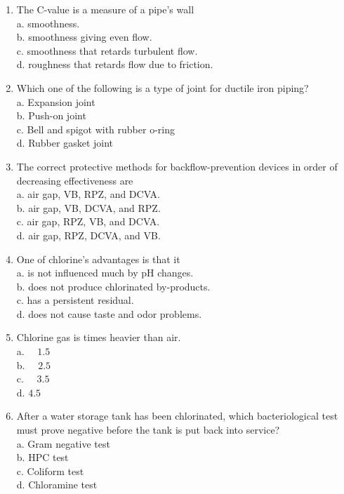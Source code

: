 \documentclass[10pt]{article}
\begin{document}
\begin{enumerate}
  \item The C-value is a measure of a pipe's wall\\
a. smoothness.\\
b. smoothness giving even flow.\\
c. smoothness that retards turbulent flow.\\
d. roughness that retards flow due to friction.

  \item Which one of the following is a type of joint for ductile iron piping?\\
a. Expansion joint\\
b. Push-on joint\\
c. Bell and spigot with rubber o-ring\\
d. Rubber gasket joint

  \item The correct protective methods for backflow-prevention devices in order of decreasing effectiveness are\\
a. air gap, VB, RPZ, and DCVA.\\
b. air gap, VB, DCVA, and RPZ.\\
c. air gap, RPZ, VB, and DCVA.\\
d. air gap, RPZ, DCVA, and VB.


  \item One of chlorine's advantages is that it\\
a. is not influenced much by $\mathrm{pH}$ changes.\\
b. does not produce chlorinated by-products.\\
c. has a persistent residual.\\
d. does not cause taste and odor problems.

  \item Chlorine gas is times heavier than air.\\
a. $\quad 1.5$\\
b. $\quad 2.5$\\
c. $\quad 3.5$\\
d. $4.5$ 

	\item After a water storage tank has been chlorinated, which bacteriological test must prove negative before the tank is put back into service?\\
a. Gram negative test\\
b. HPC test\\
c. Coliform test\\
d. Chloramine test


\end{enumerate}
\end{document}
